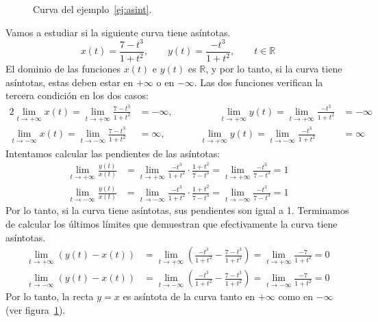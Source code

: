 \begin{figure}
\begin{center}
\end{center}
\caption{Curva del ejemplo~\ref{ej:asint}.}\label{fig:ej-asint}
\end{figure}

\begin{ejemplo}\label{ej:asint}
Vamos a estudiar si la siguiente curva tiene asíntotas.
\[
x(t)=\frac{7-t^3}{1+t^2},\qquad
y(t)=\frac{-t^3}{1+t^2},\qquad t\in\mathbb{R}
\]
El dominio de las funciones $x(t)$ e $y(t)$ es $\mathbb{R}$, y por lo tanto, si la curva tiene asíntotas, estas deben estar en $+\infty$ o en $-\infty$.
Las dos funciones verifican la tercera condición en los dos casos:
\begin{alignat*}{2}
\lim_{t\to +\infty}x(t)=\lim_{t\to +\infty}\frac{7-t^3}{1+t^2}&=-\infty, &\qquad\qquad
\lim_{t\to +\infty}y(t)=\lim_{t\to +\infty}\frac{-t^3}{1+t^2}&=-\infty \\
\lim_{t\to -\infty}x(t)=\lim_{t\to -\infty}\frac{7-t^3}{1+t^2}&=\infty, & \qquad
\lim_{t\to +\infty}y(t)=\lim_{t\to -\infty}\frac{-t^3}{1+t^2}&=\infty
\end{alignat*}
Intentamos calcular las pendientes de las asíntotas:
\begin{align*}
\lim_{t\to +\infty}\frac{y(t)}{x(t)} & =
\lim_{t\to +\infty}\frac{-t^3}{1+t^2}\cdot\frac{1+t^2}{7-t^3}=
\lim_{t\to +\infty}\frac{-t^3}{7-t^3}= 1 \\
\lim_{t\to -\infty}\frac{y(t)}{x(t)} & =
\lim_{t\to -\infty}\frac{-t^3}{1+t^2}\cdot\frac{1+t^2}{7-t^3}=
\lim_{t\to -\infty}\frac{-t^3}{7-t^3}= 1
\end{align*}
Por lo tanto, si la curva tiene asíntotas, sus pendientes son igual a 1.
Terminamos de calcular los últimos límites que demuestran que efectivamente la curva tiene asíntotas.
\begin{align*}
\lim_{t\to +\infty}(y(t)-x(t))&=
\lim_{t\to +\infty}\left(\frac{-t^3}{1+t^2}-\frac{7-t^3}{1+t^2}\right)=
\lim_{t\to +\infty}\frac{-7}{1+t^2}=0\\
\lim_{t\to -\infty}(y(t)-x(t))&=
\lim_{t\to -\infty}\left(\frac{-t^3}{1+t^2}-\frac{7-t^3}{1+t^2}\right)=
\lim_{t\to -\infty}\frac{-7}{1+t^2}=0
\end{align*}
Por lo tanto, la recta $y=x$ es asíntota de la curva tanto en $+\infty$ como en $-\infty$ (ver figura~\ref{fig:ej-asint}).\fej
\end{ejemplo}

